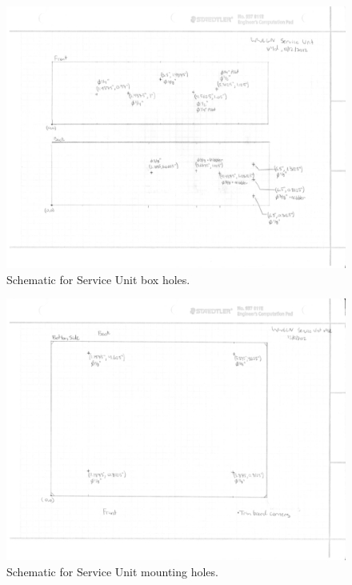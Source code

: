 \begin{landscape}
\begin{figure}[ht!]
   \centering
   \includegraphics[scale=1]{Appendix/Figures/su_box_holes_sides.pdf} 
   \caption{Schematic for Service Unit box holes.}
   \label{su:fig:suBox}
\end{figure}
\end{landscape}

\begin{landscape}
\begin{figure}[ht!]
   \centering
   \includegraphics[scale=1]{Appendix/Figures/su_box_holes_bottom.pdf} 
   \caption{Schematic for Service Unit mounting holes.}
   \label{su:fig:suBoxBot}
\end{figure}
\end{landscape}

